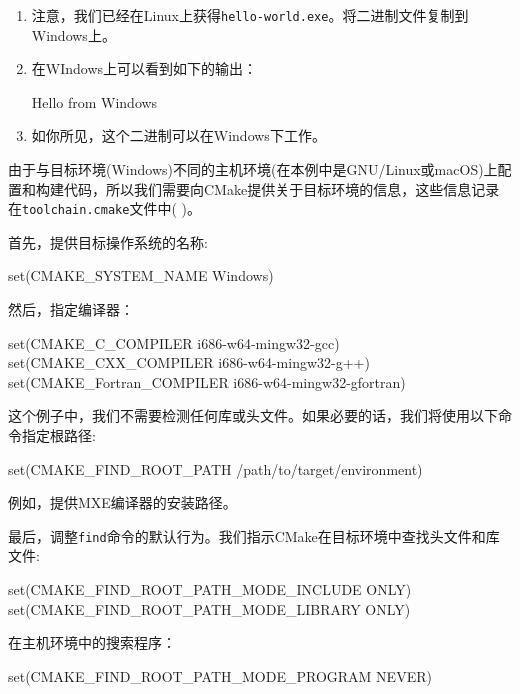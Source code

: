 \begin{enumerate}
\item 注意，我们已经在Linux上获得\texttt{hello-world.exe}。将二进制文件复制到Windows上。

\item 在WIndows上可以看到如下的输出：

\begin{codebox}[shell]
Hello from Windows
\end{codebox}

\item 如你所见，这个二进制可以在Windows下工作。

\end{enumerate}


由于与目标环境(Windows)不同的主机环境(在本例中是GNU/Linux或macOS)上配置和构建代码，所以我们需要向CMake提供关于目标环境的信息，这些信息记录在\texttt{toolchain.cmake}文件中(  )。

首先，提供目标操作系统的名称:

\begin{codebox}[cmake]
set(CMAKE_SYSTEM_NAME Windows)
\end{codebox}

然后，指定编译器：

\begin{codebox}[cmake]
set(CMAKE_C_COMPILER i686-w64-mingw32-gcc)
set(CMAKE_CXX_COMPILER i686-w64-mingw32-g++)
set(CMAKE_Fortran_COMPILER i686-w64-mingw32-gfortran)
\end{codebox}

这个例子中，我们不需要检测任何库或头文件。如果必要的话，我们将使用以下命令指定根路径:

\begin{codebox}[cmake]
set(CMAKE_FIND_ROOT_PATH /path/to/target/environment)
\end{codebox}

例如，提供MXE编译器的安装路径。

最后，调整\texttt{find}命令的默认行为。我们指示CMake在目标环境中查找头文件和库文件:

\begin{codebox}[cmake]
set(CMAKE_FIND_ROOT_PATH_MODE_INCLUDE ONLY)
set(CMAKE_FIND_ROOT_PATH_MODE_LIBRARY ONLY)
\end{codebox}

在主机环境中的搜索程序：

\begin{codebox}[cmake]
set(CMAKE_FIND_ROOT_PATH_MODE_PROGRAM NEVER)
\end{codebox}

